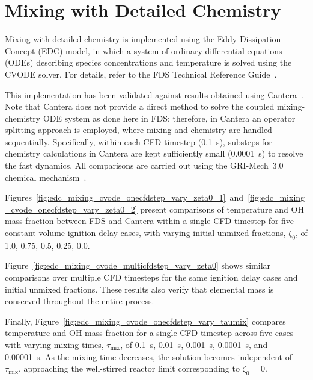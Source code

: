 \documentclass[11pt]{book}
\begin{document}
\section{Mixing with Detailed Chemistry}
\label{edc_mixing_cvode}

Mixing with detailed chemistry is implemented using the Eddy Dissipation Concept (EDC) model, in which a system of ordinary differential equations (ODEs) describing species concentrations and temperature is solved using the CVODE solver. For details, refer to the FDS Technical Reference Guide~\cite{FDS_Math_Guide}.

This implementation has been validated against results obtained using Cantera~\cite{cantera:2023}. Note that Cantera does not provide a direct method to solve the coupled mixing-chemistry ODE system as done here in FDS; therefore, in Cantera an operator splitting approach is employed, where mixing and chemistry are handled sequentially. Specifically, within each CFD timestep (0.1~s), substeps for chemistry calculations in Cantera are kept sufficiently small (0.0001~s) to resolve the fast dynamics. All comparisons are carried out using the GRI-Mech~3.0 chemical mechanism~\cite{gri3:1999}.

Figures~\ref{fig:edc_mixing_cvode_onecfdstep_vary_zeta0_1}~and~\ref{fig:edc_mixing_cvode_onecfdstep_vary_zeta0_2} present comparisons of temperature and OH mass fraction between FDS and Cantera within a single CFD timestep for five constant-volume ignition delay cases, with varying initial unmixed fractions, $\zeta_0$, of 1.0, 0.75, 0.5, 0.25, 0.0.

Figure~\ref{fig:edc_mixing_cvode_multicfdstep_vary_zeta0} shows similar comparisons over multiple CFD timesteps for the same ignition delay cases and initial unmixed fractions. These results also verify that elemental mass is conserved throughout the entire process.

Finally, Figure~\ref{fig:edc_mixing_cvode_onecfdstep_vary_taumix} compares temperature and OH mass fraction for a single CFD timestep across five cases with varying mixing times, $\tau_{\text{mix}}$, of 0.1~s, 0.01~s, 0.001~s, 0.0001~s, and 0.00001~s. As the mixing time decreases, the solution becomes independent of $\tau_{\text{mix}}$, approaching the well-stirred reactor limit corresponding to $\zeta_0 = 0$.
\end{document}
